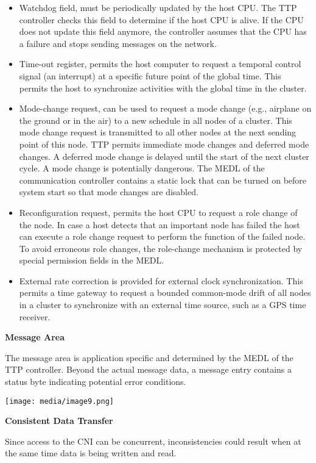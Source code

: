 \begin{itemize}
\item
  Watchdog field, must be periodically updated by the host CPU. The TTP
  controller checks this field to determine if the host CPU is alive. If
  the CPU does not update this field anymore, the controller assumes
  that the CPU has a failure and stops sending messages on the network.
\item
  Time-out register, permits the host computer to request a temporal
  control signal (an interrupt) at a specific future point of the global
  time. This permits the host to synchronize activities with the global
  time in the cluster.
\item
  Mode-change request, can be used to request a mode change (e.g.,
  airplane on the ground or in the air) to a new schedule in all nodes
  of a cluster. This mode change request is transmitted to all other
  nodes at the next sending point of this node. TTP permits immediate
  mode changes and deferred mode changes. A deferred mode change is
  delayed until the start of the next cluster cycle. A mode change is
  potentially dangerous. The MEDL of the communication controller
  contains a static lock that can be turned on before system start so
  that mode changes are disabled.
\item
  Reconfiguration request, permits the host CPU to request a role change
  of the node. In case a host detects that an important node has failed
  the host can execute a role change request to perform the function of
  the failed node. To avoid erroneous role changes, the role-change
  mechanism is protected by special permission fields in the MEDL.
\item
  External rate correction is provided for external clock
  synchronization. This permits a time gateway to request a bounded
  common-mode drift of all nodes in a cluster to syn­chronize with an
  external time source, such as a GPS time receiver.
\end{itemize}

\textbf{Message Area}

The message area is application specific and determined by the MEDL of
the TTP controller. Beyond the actual message data, a message entry
contains a status byte indicating potential error conditions.

\texttt{[image: media/image9.png]}

\textbf{Consistent Data Transfer}

Since access to the CNI can be concurrent, inconsistencies could result
when at the same time data is being written and read.

